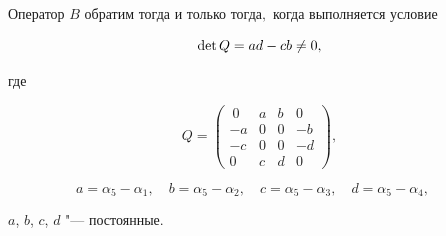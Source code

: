 \begin{theorem}[2]Оператор $B$ обратим тогда и только тогда$,$ когда выполняется условие

\begin{equation}

\label{ved.10}

\mathop{\rm det} Q=ad-cb \ne 0, 

\end{equation}

где

$$Q=\begin{pmatrix}

\ 0 & a & b & 0 \\

-a & 0 & 0 & -b\\

-c & 0 & 0 & -d\\

0& c & d & 0

\end{pmatrix},$$

\begin{equation}

a=\alpha_5-\alpha_1,\quad 

b=\alpha_5-\alpha_2,\quad 

c=\alpha_5-\alpha_3,\quad 

d=\alpha_5-\alpha_4,\quad 

\label{ved.dop.2}

\end{equation}

$a$, $b$, $c$, $ d$ "--- постоянные.

\end{theorem}



\smallskip



